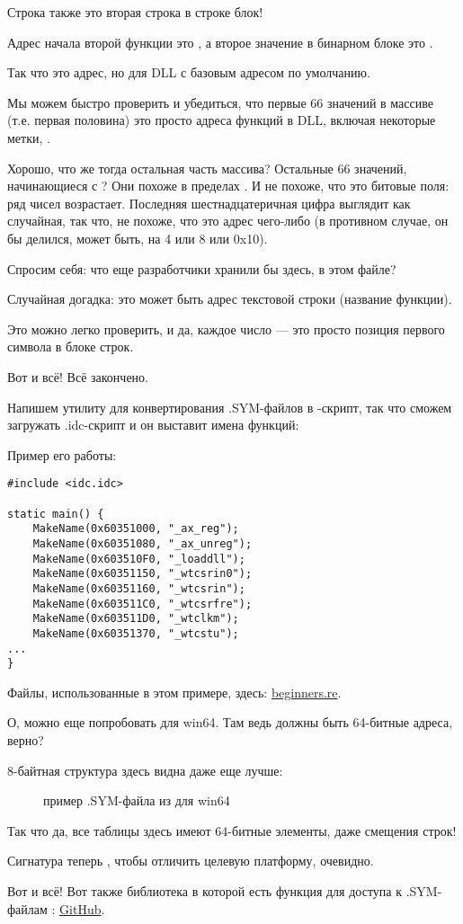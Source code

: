 Строка  также это вторая строка в строке блок!

Адрес начала второй функции это , а второе значение в бинарном блоке это .

Так что это адрес, но для DLL с базовым адресом по умолчанию.

Мы можем быстро проверить и убедиться, что первые 66 значений в массиве (т.е. первая половина)
это просто адреса функций в DLL, включая некоторые метки, \etc{}.

Хорошо, что же тогда остальная часть массива? 
Остальные 66 значений, начинающиеся с ? 
Они похоже в пределах \TT{[0...0x3F8]}. 
И не похоже, что это битовые поля: ряд чисел возрастает.
Последняя шестнадцатеричная цифра выглядит как случайная, так что, не похоже, что это
адрес чего-либо (в противном случае, он бы делился, может быть, на 4 или 8 или 0x10).

Спросим себя: что еще разработчики \oracle хранили бы здесь, в этом файле?

Случайная догадка: это может быть адрес текстовой строки (название функции).

Это можно легко проверить, и да, каждое число --- это просто позиция первого символа в блоке строк.

Вот и всё! Всё закончено.

Напишем утилиту для конвертирования .SYM-файлов в \IDA-скрипт, 
так что сможем загружать .idc-скрипт и он выставит имена функций:



Пример его работы:

\begin{lstlisting}[style=customc]
#include <idc.idc>

static main() {
	MakeName(0x60351000, "_ax_reg");
	MakeName(0x60351080, "_ax_unreg");
	MakeName(0x603510F0, "_loaddll");
	MakeName(0x60351150, "_wtcsrin0");
	MakeName(0x60351160, "_wtcsrin");
	MakeName(0x603511C0, "_wtcsrfre");
	MakeName(0x603511D0, "_wtclkm");
	MakeName(0x60351370, "_wtcstu");
...
}
\end{lstlisting}

Файлы, использованные в этом примере, здесь: \href{http://go.yurichev.com/17216}{beginners.re}.

\clearpage
О, можно еще попробовать \oracle для win64.
Там ведь должны быть 64-битные адреса, верно?

8-байтная структура здесь видна даже еще лучше:

\begin{figure}[H]
\centering
{}
\caption{пример .SYM-файла из \oracle для win64}
\label{fig:oracle_SYM_whole64}
\end{figure}

Так что да, все таблицы здесь имеют 64-битные элементы, даже смещения строк!

Сигнатура теперь , чтобы отличить целевую платформу, очевидно.

Вот и всё!
Вот также библиотека в которой есть функция для доступа к .SYM-файлам \oracle{}:
\href{http://go.yurichev.com/17007}{GitHub}.
